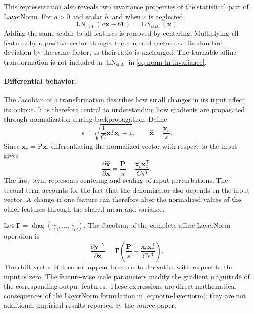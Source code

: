 This representation also reveals two invariance properties of the
statistical part of LayerNorm. For \(a>0\) and scalar \(b\), and when
\(\varepsilon\) is neglected,
\begin{equation}
    \operatorname{LN}_{\mathrm{stat}}
    (a\mathbf{x}+b\mathbf{1})
    =
    \operatorname{LN}_{\mathrm{stat}}(\mathbf{x}).
    \label{eq:norm-ln-invariance}
\end{equation}
Adding the same scalar to all features is removed by centering. Multiplying
all features by a positive scalar changes the centered vector and its
standard deviation by the same factor, so their ratio is unchanged. The
learnable affine transformation is not included in
\(\operatorname{LN}_{\mathrm{stat}}\) in
\cref{eq:norm-ln-invariance}.

\paragraph{Differential behavior.}
The Jacobian of a transformation describes how small changes in its input
affect its output. It is therefore central to understanding how gradients
are propagated through normalization during backpropagation. Define
\begin{equation}
    s
    =
    \sqrt{
        \frac{1}{C}\mathbf{x}_{c}^{\mathsf T}\mathbf{x}_{c}
        +\varepsilon
    },
    \qquad
    \widehat{\mathbf{x}}=\frac{\mathbf{x}_{c}}{s}.
    \label{eq:norm-ln-s-definition}
\end{equation}
Since \(\mathbf{x}_{c}=\mathbf{P}\mathbf{x}\), differentiating the
normalized vector with respect to the input gives
\begin{equation}
    \boxed{
    \frac{\partial\widehat{\mathbf{x}}}{\partial\mathbf{x}}
    =
    \frac{\mathbf{P}}{s}
    -
    \frac{\mathbf{x}_{c}\mathbf{x}_{c}^{\mathsf T}}
    {Cs^{3}}.
    }
    \label{eq:norm-ln-jacobian}
\end{equation}
The first term represents centering and scaling of input perturbations. The
second term accounts for the fact that the denominator also depends on the
input vector. A change in one feature can therefore alter the normalized
values of the other features through the shared mean and variance.

Let
\(\boldsymbol{\Gamma}
=\operatorname{diag}(\gamma_1,\ldots,\gamma_C)\).
The Jacobian of the complete affine LayerNorm operation is
\begin{equation}
    \frac{\partial\mathbf{y}^{\mathrm{LN}}}{\partial\mathbf{x}}
    =
    \boldsymbol{\Gamma}
    \left(
        \frac{\mathbf{P}}{s}
        -
        \frac{\mathbf{x}_{c}\mathbf{x}_{c}^{\mathsf T}}
        {Cs^{3}}
    \right).
    \label{eq:norm-ln-affine-jacobian}
\end{equation}
The shift vector \(\boldsymbol{\beta}\) does not appear because its
derivative with respect to the input is zero. The feature-wise scale
parameters modify the gradient magnitude of the corresponding output
features. These expressions are direct mathematical consequences of the
LayerNorm formulation in \cref{eq:norm-layernorm}; they are not additional
empirical results reported by the source paper.

